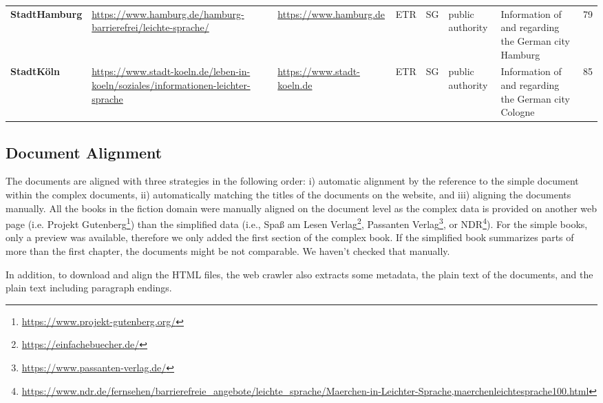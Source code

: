 \documentclass[11pt]{article}
\begin{document}
\begin{table*}[htb]
{\begin{tabular}{l|p{6.5cm}p{6.5cm}lllp{5.5cm}l}
$$\textbf{StadtHamburg} & \url{https://www.hamburg.de/hamburg-barrierefrei/leichte-sprache/} & \url{https://www.hamburg.de} & ETR & SG & public authority & Information of and regarding the German city Hamburg &  79\\
\textbf{StadtKöln} & \url{https://www.stadt-koeln.de/leben-in-koeln/soziales/informationen-leichter-sprache} & \url{https://www.stadt-koeln.de} & ETR & SG & public authority & Information of and regarding the German city Cologne & 85 \\ \end{tabular}}
\caption{This table summarizes the web pages (including metadata) which can be extracted with the web crawler. The line separates the documents in plain German from those in easy-to-read German. \textit{simple} correspond to the language level of the simplified documents, and \textit{complex} of the complex documents, where PG=plain German, ETR=easy-to-read German, SG=standard German, OG=old German. The documents marked with  $\dagger$ are openly licensed and therefore part of \textsc{DEplain-web} (row 2 and row 3 in \autoref{deplain-corpora}). All other documents are part of \textsc{DEplain-web} (row 4 in \autoref{deplain-corpora}). The data provider of the documents marked with $^\ddagger$ explicitely state that their documents are professionally simplified and reviewed by the target group.}
\label{table-deplain-doc-overview}
\end{table*}


\subsection{Document Alignment}
The documents are aligned with three strategies in the following order: i) automatic alignment by the reference to the simple document within the complex documents, ii) automatically matching the titles of the documents on the website, and iii) aligning the documents manually. 
All the books in the fiction domain were manually aligned on the document level as the complex data is provided on another web page (i.e. Projekt Gutenberg\footnote{\url{https://www.projekt-gutenberg.org/}}) than the simplified data (i.e., Spaß am Lesen Verlag\footnote{\url{https://einfachebuecher.de/}}, Passanten Verlag\footnote{\url{https://www.passanten-verlag.de/}}, or NDR\footnote{\url{https://www.ndr.de/fernsehen/barrierefreie_angebote/leichte_sprache/Maerchen-in-Leichter-Sprache,maerchenleichtesprache100.html}}). For the simple books, only a preview was available, therefore we only added the first section of the complex book. If the simplified book summarizes parts of more than the first chapter, the documents might be not comparable. We haven't checked that manually.\par
In addition, to download and align the HTML files, the web crawler also extracts some metadata, the plain text of the documents, and the plain text including paragraph endings.
\end{document}
